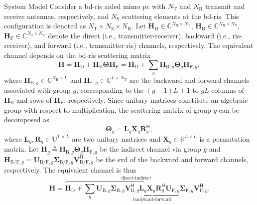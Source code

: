 \documentclass[journal]{IEEEtran}
\begin{document}
\begin{section}{System Model}
		Consider a \gls{bd}-\gls{ris} aided \gls{mimo} \gls{pc} with $N_\mathrm{T}$ and $N_\mathrm{R}$ transmit and receive antennas, respectively, and $N_\mathrm{S}$ scattering elements at the \gls{bd}-\gls{ris}.
		This configuration is denoted as $N_\mathrm{T} \times N_\mathrm{S} \times N_\mathrm{R}$.
		Let $\mathbf{H}_\mathrm{D} \in \mathbb{C}^{N_\mathrm{R} \times N_\mathrm{T}}$, $\mathbf{H}_\mathrm{B} \in \mathbb{C}^{N_\mathrm{R} \times N_\mathrm{S}}$, $\mathbf{H}_\mathrm{F} \in \mathbb{C}^{N_\mathrm{S} \times N_\mathrm{T}}$ denote the direct (i.e., transmitter-receiver), backward (i.e., \gls{ris}-receiver), and forward (i.e., transmitter-\gls{ris}) channels, respectively.
		The equivalent channel depends on the \gls{bd}-\gls{ris} scattering matrix
		\begin{equation}
			\label{eq:channel}
			\mathbf{H} = \mathbf{H}_\mathrm{D} + \mathbf{H}_\mathrm{B} \mathbf{\Theta} \mathbf{H}_\mathrm{F} = \mathbf{H}_\mathrm{D} + \sum_g \mathbf{H}_{\mathrm{B},g} \mathbf{\Theta}_g \mathbf{H}_{\mathrm{F},g},
		\end{equation}
		where $\mathbf{H}_{\mathrm{B},g} \in \mathbb{C}^{N_\mathrm{R} \times L}$ and $\mathbf{H}_{\mathrm{F},g} \in \mathbb{C}^{L \times N_\mathrm{T}}$ are the backward and forward channels associated with group $g$, corresponding to the $(g{-}1)L{+}1$ to $gL$ columns of $\mathbf{H}_\mathrm{B}$ and rows of $\mathbf{H}_\mathrm{F}$, respectively.
		Since unitary matrices constitute an algebraic group with respect to multiplication, the scattering matrix of group $g$ can be decomposed as
		\begin{equation}
			\mathbf{\Theta}_g = \mathbf{L}_g \mathbf{X}_g \mathbf{R}_g^\mathsf{H},
		\end{equation}
		where $\mathbf{L}_g, \mathbf{R}_g \in \mathbb{U}^{L \times L}$ are two unitary matrices and $\mathbf{X}_g \in \mathbb{R}^{L \times L}$ is a permutation matrix.
		Let $\mathbf{H}_g \triangleq \mathbf{H}_{\mathrm{B},g} \mathbf{\Theta}_g \mathbf{H}_{\mathrm{F},g}$ be the indirect channel via group $g$ and $\mathbf{H}_{\mathrm{B/F},g} = \mathbf{U}_{\mathrm{B/F},g} \mathbf{\Sigma}_{\mathrm{B/F},g} \mathbf{V}_{\mathrm{B/F},g}^\mathsf{H}$ be the \gls{svd} of the backward and forward channels, respectively.
		The equivalent channel is thus
		\begin{equation}
			\label{eq:channel_svd}
			\mathbf{H} = \overbrace{\mathbf{H}_\mathrm{D} + \sum_g \mathbf{U}_{\mathrm{B},g} \mathbf{\Sigma}_{\mathrm{B},g} \underbrace{\mathbf{V}_{\mathrm{B},g}^\mathsf{H} \mathbf{L}_g \mathbf{X}_g \mathbf{R}_g^\mathsf{H} \mathbf{U}_{\mathrm{F},g}}_\text{backward-forward} \mathbf{\Sigma}_{\mathrm{F},g} \mathbf{V}_{\mathrm{F},g}^\mathsf{H}}^\text{direct-indirect}.
		\end{equation}


\end{section}
\end{document}
